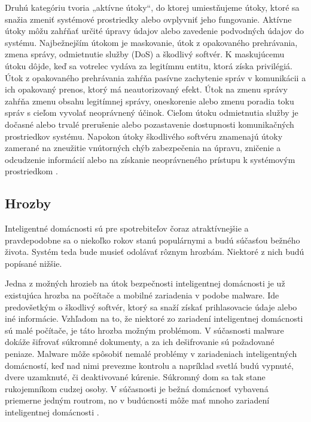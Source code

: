 \documentclass[twoside]{ctuthesis}
\theoremstyle{plain}
\theoremstyle{definition}
\theoremstyle{note}
\begin{document}
Druhú kategóriu tvoria „aktívne útoky“, do ktorej umiestňujeme útoky, ktoré sa snažia zmeniť systémové prostriedky alebo ovplyvniť jeho fungovanie. Aktívne útoky môžu zahŕňať určité úpravy údajov alebo zavedenie podvodných údajov do systému. Najbežnejším útokom je maskovanie, útok z opakovaného prehrávania, zmena správy, odmietnutie služby (DoS) a škodlivý softvér. K maskujúcemu útoku dôjde, keď sa votrelec vydáva za legitímnu entitu, ktorá získa privilégiá. Útok z opakovaného prehrávania zahŕňa pasívne zachytenie správ v komunikácii a ich opakovaný prenos, ktorý má neautorizovaný efekt. Útok na zmenu správy zahŕňa zmenu obsahu legitímnej správy, oneskorenie alebo zmenu poradia toku správ s cieľom vyvolať neoprávnený účinok. Cieľom útoku odmietnutia služby je dočasné alebo trvalé prerušenie alebo pozastavenie dostupnosti komunikačných prostriedkov systému. Napokon útoky škodlivého softvéru znamenajú útoky zamerané na zneužitie vnútorných chýb zabezpečenia na úpravu, zničenie a odcudzenie informácií alebo na získanie neoprávneného prístupu k systémovým prostriedkom \cite{security}.
\newline

\subsection{Hrozby}
Inteligentné domácnosti sú pre spotrebiteľov čoraz atraktívnejšie a pravdepodobne sa o niekoľko rokov stanú populárnymi a budú súčasťou bežného života. 
Systém teda bude musieť odolávať rôznym hrozbám. Niektoré z nich budú popísané nižšie.
\newline

Jedna z možných hrozieb na útok bezpečnosti inteligentnej domácnosti je už existujúca hrozba na počítače a mobilné zariadenia v podobe malware. Ide predovšetkým o škodlivý softvér, ktorý sa snaží získať prihlasovacie údaje alebo iné informácie. Vzhľadom na to, že niektoré zo zariadení inteligentnej domácnosti sú malé počítače, je táto hrozba možným problémom. V súčasnosti malware dokáže šifrovať súkromné dokumenty, a za ich dešifrovanie sú požadované peniaze. Malware môže spôsobiť nemalé problémy v zariadeniach inteligentných domácností, keď nad nimi prevezme kontrolu a napríklad svetlá budú vypnuté, dvere uzamknuté, či deaktivované kúrenie. Súkromný dom sa tak stane rukojemníkom cudzej osoby. V súčasnosti je bežná domácnosť vybavená priemerne jedným routrom, no v budúcnosti môže mať mnoho zariadení inteligentnej domácnosti \cite{threats}.
\newline
\end{document}
